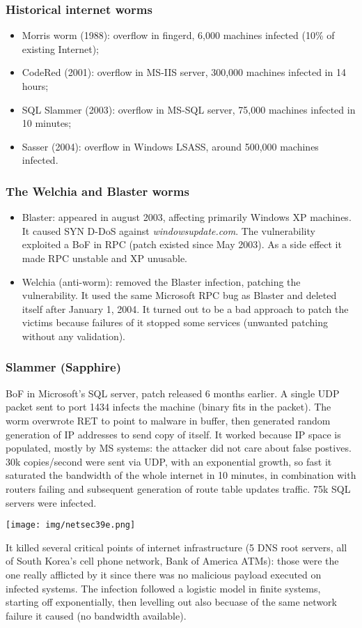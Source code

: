\documentclass[a4paper, 10pt, titlepage]{article}
\begin{document}
\subsubsection*{Historical internet worms}
\begin{itemize}
	\item Morris worm (1988): overflow in fingerd, 6,000 machines infected (10\% of existing Internet);
	\item CodeRed (2001): overflow in MS-IIS server, 300,000 machines infected in 14 hours;
	\item SQL Slammer (2003): overflow in MS-SQL server, 75,000 machines infected in 10 minutes;
	\item Sasser (2004): overflow in Windows LSASS, around 500,000 machines infected.
\end{itemize}

\subsubsection{The Welchia and Blaster worms}
\begin{itemize}
	\item Blaster: appeared in august 2003, affecting primarily Windows XP machines. It caused SYN D-DoS against \textit{windowsupdate.com}.
	The vulnerability exploited a BoF in RPC (patch existed since May 2003). As a side effect it made RPC unstable and XP unusable.
	\item Welchia (anti-worm): removed the Blaster infection, patching the vulnerability. It used the same Microsoft RPC bug as Blaster and deleted itself after January 1, 2004. It turned out to be a bad approach to patch the victims because failures of it stopped some services (unwanted patching without any validation).
\end{itemize}

\subsubsection{Slammer (Sapphire)}
BoF in Microsoft’s SQL server, patch released 6 months earlier. A single UDP packet sent to port 1434 infects the machine (binary fits in the packet). The worm overwrote RET to point to malware in buffer, then generated random generation of IP addresses to send copy of itself. It worked because IP space is populated, mostly by MS systems: the attacker did not care about false postives. 30k copies/second were sent via UDP, with an exponential growth, so fast it saturated the bandwidth of the whole internet in 10 minutes, in combination with routers failing and subsequent generation of route table updates traffic. 75k SQL servers were infected.
\begin{center}
	\texttt{[image: img/netsec39e.png]}
\end{center}
It killed several critical points of internet infrastructure (5 DNS root servers, all of South Korea’s cell phone network, Bank of America ATMs): those were the one really afflicted by it since there was no malicious payload executed on infected systems. The infection followed a logistic model in finite systems, starting off exponentially, then levelling out also becuase of the same network failure it caused (no bandwidth available).
\end{document}
